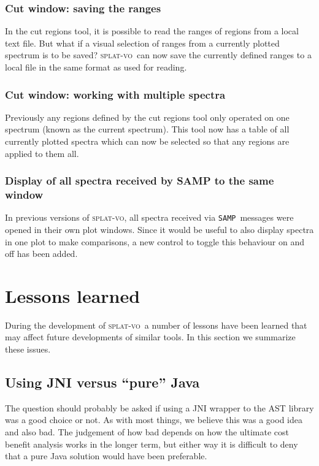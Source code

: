 \documentclass[final,authoryear,5p,times,twocolumn]{elsarticle}
\newcommand{\samp}{\texttt{SAMP}}
\newcommand{\splatvo}{\textsc{splat-vo}}
\begin{document}
\subsubsection{Cut window: saving the ranges}

In the cut regions tool, it is possible to read the ranges of regions from a
local text file. But what if a visual selection of ranges from a currently
plotted spectrum is to be saved?  \splatvo\ can now save the currently
defined ranges to a local file in the same format as used for reading.

\subsubsection{Cut window: working with multiple spectra}

Previously any regions defined by the cut regions tool only operated on one
spectrum (known as the current spectrum). This tool now has a table of all
currently plotted spectra which can now be selected so that any regions are
applied to them all.

\subsubsection{Display of all spectra received by SAMP to the same window}

In previous versions of \splatvo, all spectra received via \samp\ messages
were opened in their own plot windows. Since it would be useful
to also display spectra in one plot to make comparisons, a new control to
toggle this behaviour on and off has been added.

\section{Lessons learned}

During the development of \splatvo\ a number of lessons have been
learned that may affect future developments of similar tools. In this
section we summarize these issues.

\subsection{Using JNI versus ``pure'' Java}
\label{sec:jniast-lesson}

The question should probably be asked if using a JNI wrapper to the
AST library was a good choice or not. As with most things, we believe
this was a good idea and also bad. The judgement of how bad depends on
how the ultimate cost benefit analysis works in the longer term, but
either way it is difficult to deny that a pure Java solution would
have been preferable.
\end{document}
